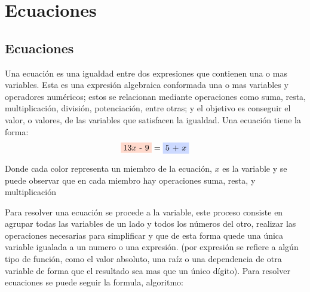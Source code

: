 
\section{Ecuaciones}
\subsection{Ecuaciones}\label{Ecuaciones}
Una ecuación es una igualdad entre dos expresiones que contienen una o mas
variables.  Esta es una expresión algebraica conformada una o mas variables y
operadores numéricos; estos se relacionan mediante operaciones como
suma, resta, multiplicación, división, potenciación, entre otras; y el objetivo
es conseguir el valor, o valores, de las variables que satisfacen la igualdad.
Una ecuación tiene la forma:
$$ \colorbox{RojoClaro}{13$x$ - 9}= \colorbox{AzulClaro}{5 + $x$} $$

Donde cada color representa un miembro de la ecuación, $x$ es la variable y se
puede observar que en cada miembro hay operaciones  suma, resta, y multiplicación


Para resolver una ecuación se procede a  la variable, este
proceso consiste
en agrupar todas las variables de un lado y todos los números del otro, realizar
las operaciones necesarias para simplificar y que de esta forma quede una única
variable igualada a un numero o una expresión. (por expresión se refiere a algún
tipo de función, como el valor absoluto, una raíz o una dependencia de otra variable
de forma que el resultado sea mas que un único dígito). Para resolver ecuaciones
se puede seguir la formula, algoritmo:


